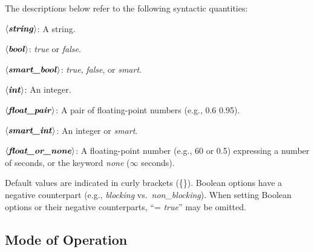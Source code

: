\documentclass[a4paper,12pt]{article}
\def\qtybf#1{$\mathbf{\left<\textbf{\textit{#1\/}}\right>}$}
\begin{document}
The descriptions below refer to the following syntactic quantities:

\begin{enum}
\item[\labelitemi] \qtybf{string}: A string.
\item[\labelitemi] \qtybf{bool\/}: \textit{true} or \textit{false}.
\item[\labelitemi] \qtybf{smart\_bool\/}: \textit{true}, \textit{false}, or
\textit{smart}.
\item[\labelitemi] \qtybf{int\/}: An integer.
\item[\labelitemi] \qtybf{float\_pair\/}: A pair of floating-point numbers
(e.g., 0.6 0.95).
\item[\labelitemi] \qtybf{smart\_int\/}: An integer or \textit{smart}.
\item[\labelitemi] \qtybf{float\_or\_none\/}: A floating-point number (e.g., 60 or
0.5) expressing a number of seconds, or the keyword \textit{none} ($\infty$
seconds).
\end{enum}

Default values are indicated in curly brackets (\textrm{\{\}}). Boolean options
have a negative counterpart (e.g., \textit{blocking} vs.\
\textit{non\_blocking}). When setting Boolean options or their negative
counterparts, ``= \textit{true\/}'' may be omitted.

\subsection{Mode of Operation}
\label{mode-of-operation}
\end{document}
